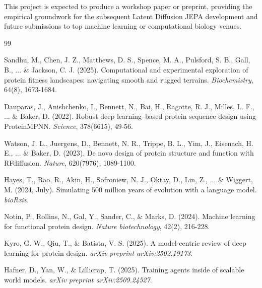 \documentclass[12pt, a4paper]{article}
\begin{document}
This project is expected to produce a workshop paper or preprint, providing the empirical groundwork for the subsequent Latent Diffusion JEPA development and future submissions to top machine learning or computational biology venues.



\newpage


\begin{thebibliography}{99}

Sandhu, M., Chen, J. Z., Matthews, D. S., Spence, M. A., Pulsford, S. B., Gall, B., ... \& Jackson, C. J. (2025). 
\newblock Computational and experimental exploration of protein fitness landscapes: navigating smooth and rugged terrains. 
\newblock \textit{Biochemistry}, 64(8), 1673-1684.


Dauparas, J., Anishchenko, I., Bennett, N., Bai, H., Ragotte, R. J., Milles, L. F., ... \& Baker, D. (2022). \newblock Robust deep learning–based protein sequence design using ProteinMPNN. \newblock \textit{Science}, 378(6615), 49-56.


Watson, J. L., Juergens, D., Bennett, N. R., Trippe, B. L., Yim, J., Eisenach, H. E., ... \& Baker, D. (2023). \newblock De novo design of protein structure and function with RFdiffusion. \newblock \textit{Nature}, 620(7976), 1089-1100.


Hayes, T., Rao, R., Akin, H., Sofroniew, N. J., Oktay, D., Lin, Z., ... \& Wiggert, M. (2024, July). \newblock Simulating 500 million years of evolution with a language model. \newblock \textit{bioRxiv}.


Notin, P., Rollins, N., Gal, Y., Sander, C., \& Marks, D. (2024). \newblock Machine learning for functional protein design. \newblock \textit{Nature biotechnology}, 42(2), 216-228.


Kyro, G. W., Qiu, T., \& Batista, V. S. (2025). \newblock A model-centric review of deep learning for protein design. \newblock \textit{arXiv preprint arXiv:2502.19173}.


Hafner, D., Yan, W., \& Lillicrap, T. (2025). \newblock Training agents inside of scalable world models. \newblock \textit{arXiv preprint arXiv:2509.24527}.



\end{thebibliography}
\end{document}

